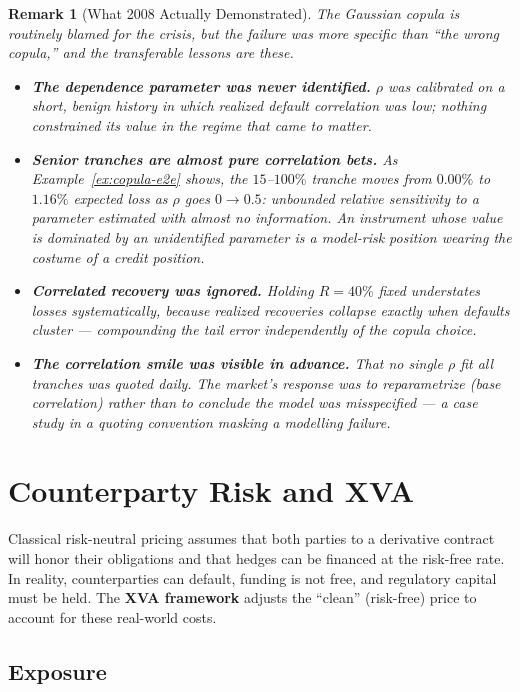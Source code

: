 \documentclass{report}
\theoremstyle{spacedplain}
\theoremstyle{spaceddefinition}
\theoremstyle{spacedremark}
\newtheorem{remark}[theorem]{Remark}
\begin{document}
\begin{remark}[What 2008 Actually Demonstrated]
The Gaussian copula is routinely blamed for the crisis, but the failure was more specific than ``the wrong copula,'' and the transferable lessons are these.
\begin{itemize}
    \item \textbf{The dependence parameter was never identified.} $\rho$ was calibrated on a short, benign history in which realized default correlation was low; nothing constrained its value in the regime that came to matter.
    \item \textbf{Senior tranches are almost pure correlation bets.} As Example~\ref{ex:copula-e2e} shows, the $15$--$100\%$ tranche moves from $0.00\%$ to $1.16\%$ expected loss as $\rho$ goes $0 \to 0.5$: unbounded relative sensitivity to a parameter estimated with almost no information. An instrument whose value is dominated by an unidentified parameter is a model-risk position wearing the costume of a credit position.
    \item \textbf{Correlated recovery was ignored.} Holding $R = 40\%$ fixed understates losses systematically, because realized recoveries collapse exactly when defaults cluster --- compounding the tail error independently of the copula choice.
    \item \textbf{The correlation smile was visible in advance.} That no single $\rho$ fit all tranches was quoted daily. The market's response was to reparametrize (base correlation) rather than to conclude the model was misspecified --- a case study in a quoting convention masking a modelling failure.
\end{itemize}
\end{remark}



\section{Counterparty Risk and XVA}

Classical risk-neutral pricing assumes that both parties to a derivative contract will honor their obligations and that hedges can be financed at the risk-free rate. In reality, counterparties can default, funding is not free, and regulatory capital must be held. The \textbf{XVA framework} adjusts the ``clean'' (risk-free) price to account for these real-world costs.

\subsection{Exposure}
\end{document}
